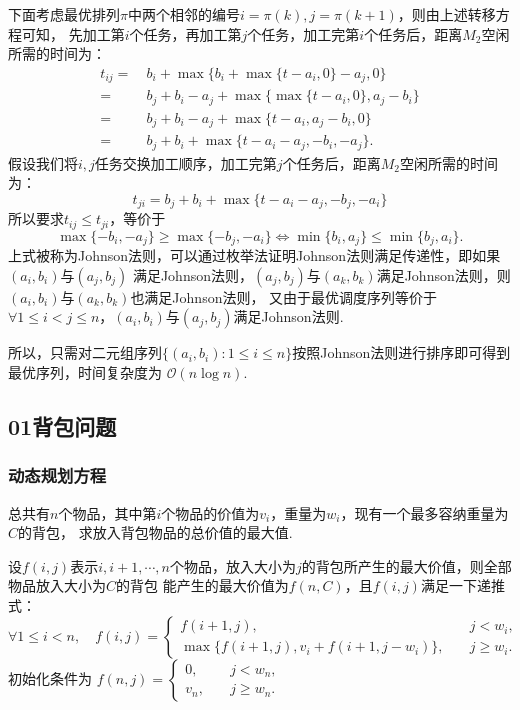 \documentclass[12pt, a4paper, oneside]{ctexart}
\numberwithin{equation}{section}  %
\theoremstyle{definition}
\let\leq=\leqslant %
\let\geq=\geqslant %
\def\O{\mathcal{O}}         %
\def\del{\vspace{-1.5ex}}   %
\begin{document}
下面考虑最优排列$\pi$中两个相邻的编号$i=\pi(k),j=\pi(k+1)$，则由上述转移方程可知，
先加工第$i$个任务，再加工第$j$个任务，加工完第$i$个任务后，距离$M_2$空闲所需的时间为：
\begin{align*}
    t_{ij} =&\ b_i + \max\{b_i+\max\{t-a_i,0\}-a_j,0\}\\
    =&\ b_j+b_i-a_j+\max\{\max\{t-a_i,0\},a_j-b_i\}\\
    =&\ b_j+b_i-a_j+\max\{t-a_i,a_j-b_i,0\}\\
    =&\ b_j+b_i + \max\{t-a_i-a_j, -b_i, -a_j\}.
\end{align*}
假设我们将$i,j$任务交换加工顺序，加工完第$j$个任务后，距离$M_2$空闲所需的时间为：
\begin{equation*}
    t_{ji} = b_j+b_i + \max\{t-a_i-a_j, -b_j, -a_i\}
\end{equation*}
所以要求$t_{ij} \leq t_{ji}$，等价于
\begin{equation*}
    \max\{-b_i, -a_j\}\geq \max\{-b_j, -a_i\}\iff \min\{b_i, a_j\}\leq \min\{b_j, a_i\}.
\end{equation*}
上式被称为Johnson法则，可以通过枚举法证明Johnson法则满足传递性，即如果$(a_i,b_i)$与$(a_j,b_j)$
满足Johnson法则，$(a_j,b_j)$与$(a_k,b_k)$满足Johnson法则，则$(a_i,b_i)$与$(a_k,b_k)$也满足Johnson法则，
又由于最优调度序列等价于$\forall 1\leq i < j\leq n$，$(a_i,b_i)$与$(a_j,b_j)$满足Johnson法则.

所以，只需对二元组序列$\{(a_i,b_i):1\leq i\leq n\}$按照Johnson法则进行排序即可得到最优序列，时间复杂度为
$\O(n\log n)$.
\del
\subsection{01背包问题}\del
\subsubsection{动态规划方程}
总共有$n$个物品，其中第$i$个物品的价值为$v_i$，重量为$w_i$，现有一个最多容纳重量为$C$的背包，
求放入背包物品的总价值的最大值.

设$f(i,j)$表示$i,i+1,\cdots,n$个物品，放入大小为$j$的背包所产生的最大价值，则全部物品放入大小为$C$的背包
能产生的最大价值为$f(n,C)$，且$f(i,j)$满足一下递推式：
\begin{equation*}
    \forall 1\leq i < n,\quad f(i,j) = \begin{cases}
        f(i+1,j),&\quad j < w_i,\\
        \max\{f(i+1,j),v_i+f(i+1,j-w_i)\},&\quad j\geq w_i.
    \end{cases}
\end{equation*}
初始化条件为
$f(n, j) = \begin{cases}
    0, &\quad j < w_n,\\
    v_n,&\quad j \geq w_n.
\end{cases}$
\end{document}
